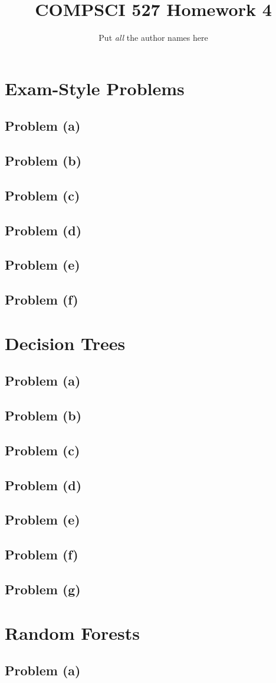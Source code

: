 \documentclass[11pt]{article}
\title{COMPSCI 527 Homework 4}
\author{Put \emph{all} the author names here}
\date{}
\newcommand{\newsection}[1]{\newpage\section*{#1}}
\newcommand{\newproblem}[1]{\newpage\subsection*{#1}}
\newcommand{\includeCode}[1]{\VerbatimInput[fontsize=\small,fontshape=rm]{#1}}
\begin{document}
\maketitle
\section*{Exam-Style Problems}

\subsection*{Problem (a)}

\newproblem{Problem (b)}

\newproblem{Problem (c)}

\newproblem{Problem (d)}

\newproblem{Problem (e)}

\newproblem{Problem (f)}

\newsection{Decision Trees}

\subsection*{Problem (a)}


\newproblem{Problem (b)}


\newproblem{Problem (c)}


\newproblem{Problem (d)}

\newproblem{Problem (e)}

\newproblem{Problem (f)}

\newproblem{Problem (g)}

\newsection{Random Forests}

\subsection*{Problem (a)}

\end{document}
